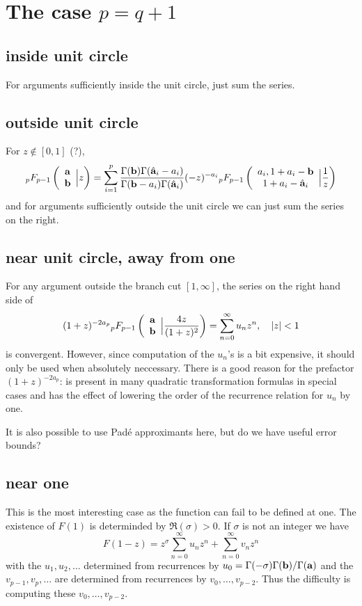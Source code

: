 \documentclass[10pt]{article}
\newcommand{\F}[5] {{}_{#1}F_{#2} \left( \begin{array}{c} #3 \\ #4 \end{array} \Big| #5  \right)}
\begin{document}
\section{The case $p=q+1$}

\subsection{inside unit circle}
For arguments sufficiently inside the unit circle, just sum the series.

\subsection{outside unit circle}
For $z \not \in [0,1]$ (?),
\begin{equation*}
\F{p}{p-1}{\bold{a}}{\bold{b}}{z} = \sum_{i=1}^{p} \frac{\Gamma(\bold{b}) \Gamma(\hat{\bold{a}}_i-a_i)}{\Gamma(\bold{b}-a_i) \Gamma(\hat{\bold{a}}_i)} (-z)^{-a_i} \F{p}{p-1}{a_i,1+a_i-\bold{b}}{1+a_i-\hat{\bold{a}}_i}{\frac{1}{z}}
\end{equation*}
and for arguments sufficiently outside the unit circle we can just sum the series on the right.

\subsection{near unit circle, away from one}
For any argument outside the branch cut $[1,\infty]$, the series on the right hand side of
\begin{equation*}
(1+z)^{-2 a_p} \F{p}{p-1}{\bold{a}}{\bold{b}}{\frac{4 z}{(1+z)^2}} = \sum_{n=0}^{\infty}u_n z^n, \quad |z| < 1
\end{equation*}
is convergent. However, since computation of the $u_n$'s is a bit expensive, it should only be used when absolutely neccessary. There is a good reason for the prefactor $(1+z)^{-2a_p}$: is present in many quadratic transformation formulas in special cases and has the effect of lowering the order of the recurrence relation for $u_n$ by one.

It is also possible to use Pad\'e approximants here, but do we have useful error bounds?

\subsection{near one}

This is the most interesting case as the function can fail to be defined at one. The existence of $F(1)$ is determinded by $\Re(\sigma)> 0$. If $\sigma$ is not an integer we have
\begin{equation}
\label{nearone}
F(1-z) = z^{\sigma} \sum_{n=0}^{\infty} u_n z^n + \sum_{n=0}^{\infty} v_n z^n
\end{equation}
with the $u_1,u_2,\dots$ determined from recurrences by $u_0 = \Gamma(-\sigma)\Gamma(\bold{b})/\Gamma(\bold{a})$ and the $v_{p-1}, v_p, \dots$ are determined from recurrences by $v_0, \dots, v_{p-2}$. Thus the difficulty is computing these $v_0, \dots, v_{p-2}$.
\end{document}
